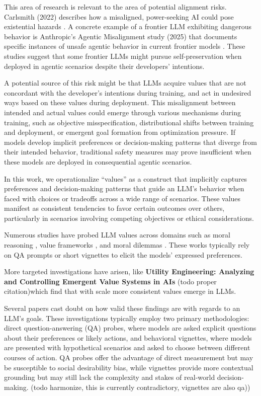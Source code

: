 \documentclass[11pt]{article}
\begin{document}
This area of research is relevant to the area of potential alignment risks. Carlsmith (2022) describes how a misaligned, power-seeking AI could pose existential hazards \cite{carlsmith2022power}. A concrete example of a frontier LLM exhibiting dangerous behavior is Anthropic's Agentic Misalignment study (2025) that documents specific instances of unsafe agentic behavior in current frontier models \cite{anthropic2025agentic}. These studies suggest that some frontier LLMs might pursue self-preservation when deployed in agentic scenarios despite their developers' intentions.

A potential source of this risk might be that LLMs acquire values that are not concordant with the developer's intentions during training, and act in undesired ways based on these values during deployment. This misalignment between intended and actual values could emerge through various mechanisms during training, such as objective misspecification, distributional shifts between training and deployment, or emergent goal formation from optimization pressure. If models develop implicit preferences or decision-making patterns that diverge from their intended behavior, traditional safety measures may prove insufficient when these models are deployed in consequential agentic scenarios.

In this work, we operationalize ``values'' as a construct that implicitly captures preferences and decision-making patterns that guide an LLM's behavior when faced with choices or tradeoffs across a wide range of scenarios. These values manifest as consistent tendencies to favor certain outcomes over others, particularly in scenarios involving competing objectives or ethical considerations. 

Numerous studies have probed LLM values across domains such as moral reasoning \cite{hendrycks2021aligning}, value frameworks \cite{yao2024fulcra}, and moral dilemmas \cite{scherrer2023moral}. These works typically rely on QA prompts or short vignettes to elicit the models' expressed preferences.

More targeted investigations have arisen, like \textbf{Utility Engineering: Analyzing and Controlling Emergent Value Systems in AIs} (todo proper citation)which find that with scale more consistent values emerge in LLMs.

Several papers cast doubt on how valid these findings are with regards to an LLM's goals. These investigations typically employ two primary methodologies: direct question-answering (QA) probes, where models are asked explicit questions about their preferences or likely actions, and behavioral vignettes, where models are presented with hypothetical scenarios and asked to choose between different courses of action. QA probes offer the advantage of direct measurement but may be susceptible to social desirability bias, while vignettes provide more contextual grounding but may still lack the complexity and stakes of real-world decision-making. (todo harmonize, this is currently contradictory, vignettes are also qa))
\end{document}
